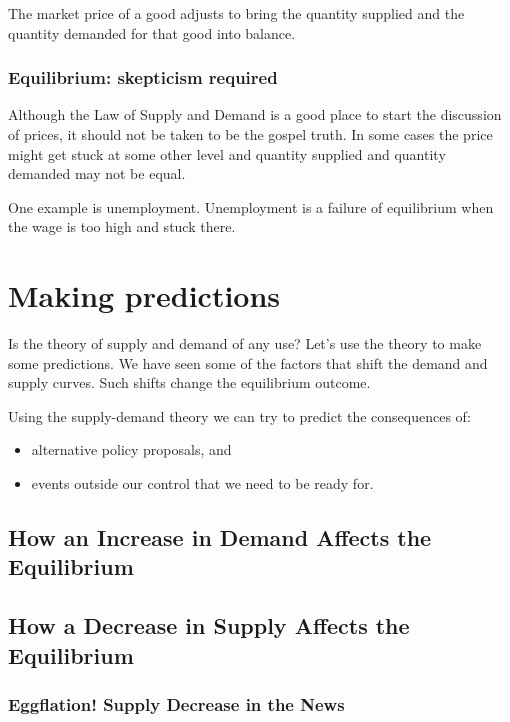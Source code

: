 \documentclass[
  letterpaper,
]{book}
\providecommand{\tightlist}{%
  \setlength{\itemsep}{0pt}\setlength{\parskip}{0pt}}\usepackage{longtable,booktabs,array}
\begin{document}
The market price of a good adjusts to bring the quantity supplied and
the quantity demanded for that good into balance.

\subsubsection{Equilibrium: skepticism
required}\label{equilibrium-skepticism-required}

Although the Law of Supply and Demand is a good place to start the
discussion of prices, it should not be taken to be the gospel truth. In
some cases the price might get stuck at some other level and quantity
supplied and quantity demanded may not be equal.

One example is unemployment. Unemployment is a failure of equilibrium
when the wage is too high and stuck there.

\section{Making predictions}\label{making-predictions}

Is the theory of supply and demand of any use? Let's use the theory to
make some predictions. We have seen some of the factors that shift the
demand and supply curves. Such shifts change the equilibrium outcome.

Using the supply-demand theory we can try to predict the consequences
of:

\begin{itemize}
\tightlist
\item
  alternative policy proposals, and
\item
  events outside our control that we need to be ready for.
\end{itemize}

\subsection{How an Increase in Demand Affects the
Equilibrium}\label{how-an-increase-in-demand-affects-the-equilibrium}

\subsection{How a Decrease in Supply Affects the
Equilibrium}\label{how-a-decrease-in-supply-affects-the-equilibrium}

\subsubsection{Eggflation! Supply Decrease in the
News}\label{eggflation-supply-decrease-in-the-news}
\end{document}
